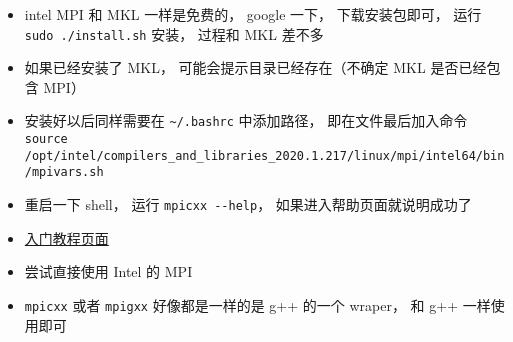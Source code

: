 
\begin{issues}
\issueDraft
\end{issues}

\begin{itemize}
\item intel MPI 和 MKL 一样是免费的， google 一下， 下载安装包即可， 运行 \verb`sudo ./install.sh` 安装， 过程和 MKL 差不多
\item 如果已经安装了 MKL， 可能会提示目录已经存在（不确定 MKL 是否已经包含 MPI）
\item 安装好以后同样需要在 \verb`~/.bashrc` 中添加路径， 即在文件最后加入命令 \verb`source /opt/intel/compilers_and_libraries_2020.1.217/linux/mpi/intel64/bin/mpivars.sh`
\item 重启一下 shell， 运行 \verb`mpicxx --help`， 如果进入帮助页面就说明成功了


\item \href{https://people.sc.fsu.edu/~jburkardt/cpp_src/hello_mpi/hello_mpi.html}{入门教程页面}
\item 尝试直接使用 Intel 的 MPI
\item \verb`mpicxx` 或者 \verb`mpigxx` 好像都是一样的是 g++ 的一个 wraper， 和 g++ 一样使用即可
\end{itemize}
